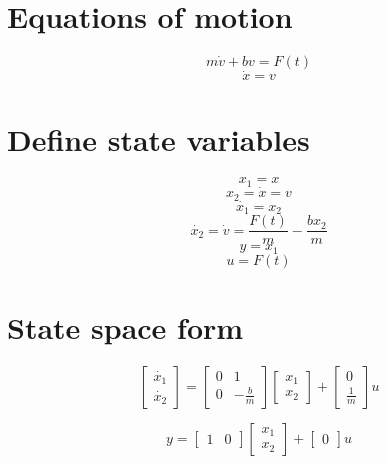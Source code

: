 \documentclass[12pt, letterpaper]{article}
\begin{document}
\section{Equations of motion}
\begin{equation} m \dot{v} + bv = F(t) \end{equation}
\begin{equation} \dot{x} = v \end{equation}

\section{Define state variables}
\begin{equation} x_{1} = x \end{equation}
\begin{equation} x_{2} = \dot{x} = v \end{equation}
\begin{equation} \dot{x_{1}} = x_{2} \end{equation}
\begin{equation} \dot{x_{2}} = \dot{v} = \frac{F(t)}{m} - \frac{bx_{2}}{m} \end{equation}
\begin{equation} y = x_{1} \end{equation}
\begin{equation} u = F(t)\end{equation}

\section{State space form}
\begin{equation}
\begin{bmatrix} \dot{x_{1}} \\ \dot{x_{2}} \end{bmatrix} 
= 
\begin{bmatrix} 0 & 1 \\ 0 & -\frac{b}{m} \end{bmatrix} 
\begin{bmatrix} x_{1}\\ x_{2} \end{bmatrix} 
+ 
\begin{bmatrix} 0\\ \frac{1}{m} \end{bmatrix}u
\end{equation}

\begin{equation} y = \begin{bmatrix} 1 & 0 \end{bmatrix} \begin{bmatrix} x_{1} \\ x_{2} \end{bmatrix} + \begin{bmatrix} 0 \end{bmatrix}u
\end{equation}
\end{document}
